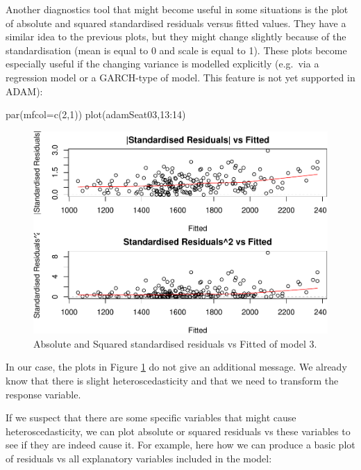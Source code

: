 \documentclass[
]{book}
\newenvironment{Shaded}{\begin{snugshade}}{\end{snugshade}}
\newcommand{\AttributeTok}[1]{\textcolor[rgb]{0.77,0.63,0.00}{#1}}
\newcommand{\DecValTok}[1]{\textcolor[rgb]{0.00,0.00,0.81}{#1}}
\newcommand{\FunctionTok}[1]{\textcolor[rgb]{0.00,0.00,0.00}{#1}}
\newcommand{\NormalTok}[1]{#1}
\newcommand{\SpecialCharTok}[1]{\textcolor[rgb]{0.00,0.00,0.00}{#1}}
\theoremstyle{definition}
\theoremstyle{definition}
\theoremstyle{definition}
\theoremstyle{definition}
\theoremstyle{remark}
\begin{document}
Another diagnostics tool that might become useful in some situations is the plot of absolute and squared standardised residuals versus fitted values. They have a similar idea to the previous plots, but they might change slightly because of the standardisation (mean is equal to 0 and scale is equal to 1). These plots become especially useful if the changing variance is modelled explicitly (e.g.~via a regression model or a GARCH-type of model. This feature is not yet supported in ADAM):

\begin{Shaded}
\begin{Highlighting}[]
\FunctionTok{par}\NormalTok{(}\AttributeTok{mfcol=}\FunctionTok{c}\NormalTok{(}\DecValTok{2}\NormalTok{,}\DecValTok{1}\NormalTok{))}
\FunctionTok{plot}\NormalTok{(adamSeat03,}\DecValTok{13}\SpecialCharTok{:}\DecValTok{14}\NormalTok{)}
\end{Highlighting}
\end{Shaded}

\begin{figure}
\centering
\includegraphics{Svetunkov--2022----ADAM_files/figure-latex/adamSeat03HeteroStd-1.pdf}
\caption{\label{fig:adamSeat03HeteroStd}Absolute and Squared standardised residuals vs Fitted of model 3.}
\end{figure}

In our case, the plots in Figure \ref{fig:adamSeat03HeteroStd} do not give an additional message. We already know that there is slight heteroscedasticity and that we need to transform the response variable.

If we suspect that there are some specific variables that might cause heteroscedasticity, we can plot absolute or squared residuals vs these variables to see if they are indeed cause it. For example, here how we can produce a basic plot of residuals vs all explanatory variables included in the model:
\end{document}
